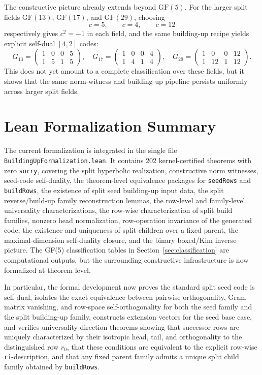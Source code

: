 \documentclass[12pt]{article}
\newcommand{\GF}[1]{\ensuremath{\mathrm{GF}(#1)}}
\begin{document}
The constructive picture already extends beyond $\GF{5}$. For the larger split fields $\GF{13}$, $\GF{17}$, and $\GF{29}$, choosing
\[
c = 5,\qquad c = 4,\qquad c = 12
\]
respectively gives $c^2 = -1$ in each field, and the same building-up recipe yields explicit self-dual $[4,2]$ codes:
\[
G_{13} =
\begin{pmatrix}
1 & 0 & 0 & 5\\
1 & 5 & 1 & 5
\end{pmatrix},
\quad
G_{17} =
\begin{pmatrix}
1 & 0 & 0 & 4\\
1 & 4 & 1 & 4
\end{pmatrix},
\quad
G_{29} =
\begin{pmatrix}
1 & 0 & 0 & 12\\
1 & 12 & 1 & 12
\end{pmatrix}.
\]
This does not yet amount to a complete classification over these fields, but it shows that the same norm-witness and building-up pipeline persists uniformly across larger split fields.

\section{Lean Formalization Summary}
\label{sec:lean}

The current formalization is integrated in the single file \texttt{BuildingUpFormalization.lean}. It contains 202 kernel-certified theorems with zero \texttt{sorry}, covering the split hyperbolic realization, constructive norm witnesses, seed-code self-duality, the theorem-level equivalence packages for \texttt{seedRows} and \texttt{buildRows}, the existence of split seed building-up input data, the split reverse/build-up family reconstruction lemmas, the row-level and family-level universality characterizations, the row-wise characterization of split build families, nonzero head normalization, row-operation invariance of the generated code, the existence and uniqueness of split children over a fixed parent, the maximal-dimension self-duality closure, and the binary boxed/Kim inverse picture. The GF(5) classification tables in Section~\ref{sec:classification} are computational outputs, but the surrounding constructive infrastructure is now formalized at theorem level.

In particular, the formal development now proves the standard split seed code is self-dual, isolates the exact equivalence between pairwise orthogonality, Gram-matrix vanishing, and row-space self-orthogonality for both the seed family and the split building-up family, constructs extension vectors for the seed base case, and verifies universality-direction theorems showing that successor rows are uniquely characterized by their isotropic head, tail, and orthogonality to the distinguished row $r_0$, that these conditions are equivalent to the explicit row-wise \texttt{ri}-description, and that any fixed parent family admits a unique split child family obtained by \texttt{buildRows}.
\end{document}
